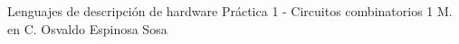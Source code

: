 




	\pnormal
	{Lenguajes de descripción de hardware}
	{Práctica 1  - Circuitos combinatorios 1}
	{M. en C. Osvaldo Espinosa Sosa}
	\tableofcontents
	
	\newpage   
	\newpage   
	\clearpage 
	\clearpage 
	\clearpage 
	\clearpage 
	\newpage   
	
	\newpage   



